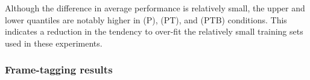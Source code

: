 \documentclass{article}
\begin{document}
Although the difference in average performance is relatively small, the upper and lower 
quantiles are notably higher in (P), (PT), and (PTB) conditions.
This indicates a reduction in the tendency to over-fit the relatively small training sets
used in these experiments.






\subsubsection{Frame-tagging results}
\end{document}
